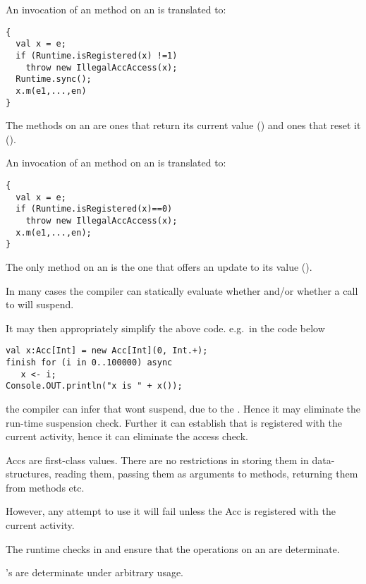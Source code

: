 
An invocation  of an  method on an  is
  translated to:
\begin{lstlisting}
{
  val x = e;
  if (Runtime.isRegistered(x) !=1)
    throw new IllegalAccAccess(x);
  Runtime.sync();
  x.m(e1,...,en)
}
\end{lstlisting}
The  methods on an  are ones that return its
current value () and ones that reset it ().

An invocation  of an  method on an
 is translated to:
\begin{lstlisting}
{
  val x = e;
  if (Runtime.isRegistered(x)==0)
    throw new IllegalAccAccess(x);
  x.m(e1,...,en);
}
\end{lstlisting}

The only  method on an  is the one that offers an
update to its value ().

In many cases the compiler can statically evaluate whether
 and/or whether a call to
  will suspend.

It may then appropriately simplify the above code. e.g.{}~in the code below
\begin{lstlisting}
val x:Acc[Int] = new Acc[Int](0, Int.+);
finish for (i in 0..100000) async
   x <- i;
Console.OUT.println("x is " + x());
\end{lstlisting}
\noindent the compiler can infer that  wont suspend, due to
the . Hence it may eliminate the run-time suspension
check. Further it can establish that  is 
registered with the current activity, hence it can eliminate the
access check.

Accs are first-class values. There are no restrictions in storing
   them in data-structures, reading them, passing them as arguments to
   methods, returning them from methods etc.

   However, any attempt to use it will fail unless the Acc is
   registered with the current activity.


The runtime checks in  and
  ensure that the operations on an
 are determinate.


\begin{proposition}
's are determinate under arbitrary usage.
\end{proposition}


